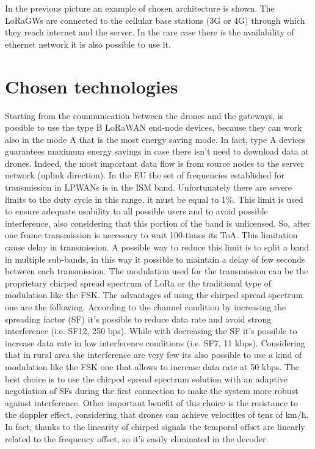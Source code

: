 \documentclass[12pt]{report}
\begin{document}
In the previous picture an example of chosen architecture is shown. The LoRaGWs are connected to the cellular base stations (3G or 4G) through which they reach internet and the server. In the rare case there is the availability of ethernet network it is also possible to use it.

\chapter{Chosen technologies}

Starting from the communication between the drones and the gateways, is possible to use the type B LoRaWAN end-node devices, because they can work also in the mode A that is the most energy saving mode. In fact, type A devices guarantees maximum energy savings in case there isn't need to download data at drones. Indeed, the most important data flow is from source nodes to the server network (uplink direction). In the EU the set of frequencies established for transmission in LPWANs is in the ISM band. 
Unfortunately there are severe limits to the duty cycle in this range, it must be equal to 1\%. This limit is used to ensure adequate usability to all possible users and to avoid possible interference, also considering that this portion of the band is unlicensed. So, after one frame transmission is necessary to wait 100-times its ToA. This limitation cause delay in transmission. A possible way to reduce this limit is to split a band in multiple sub-bands, in this way it possible to maintain a delay of few seconds between each transmission.  The modulation used for the transmission can be the proprietary chirped spread spectrum of LoRa or the traditional type of modulation like the FSK. The advantages of using the chirped spread spectrum one are the following. According to the channel condition by increasing the spreading factor (SF) it's possible to reduce data rate and avoid strong interference (i.e. SF12, 250 bps). While with decreasing the SF it's possible to increase data rate in low interference conditions (i.e. SF7, 11 kbps). Considering that in rural area the interference are very few its also possible to use a kind of modulation like the FSK one that allows to increase data rate at 50 kbps. The best choice is to use the chirped spread spectrum solution with an adaptive negotiation of SFs during the first connection to make the system more robust against interference. Other important benefit of this choice is the resistance to the doppler effect, considering that drones can achieve velocities of tens of km/h. In fact, thanks to the linearity of chirped signals the temporal offset are linearly related to the frequency offset, so it's easily eliminated in the decoder.
\end{document}
